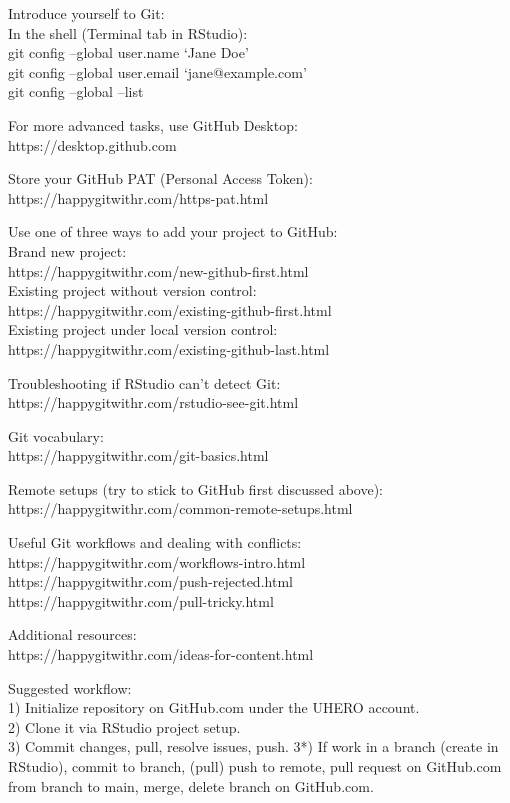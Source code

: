 \documentclass[
  letterpaper,
  DIV=11,
  numbers=noendperiod]{scrreport}
\begin{document}
Introduce yourself to Git:\\
In the shell (Terminal tab in RStudio):\\
git config --global user.name `Jane Doe'\\
git config --global user.email `jane@example.com'\\
git config --global --list

For more advanced tasks, use GitHub Desktop:\\
https://desktop.github.com

Store your GitHub PAT (Personal Access Token):\\
https://happygitwithr.com/https-pat.html

Use one of three ways to add your project to GitHub:\\
Brand new project:\\
https://happygitwithr.com/new-github-first.html\\
Existing project without version control:\\
https://happygitwithr.com/existing-github-first.html\\
Existing project under local version control:\\
https://happygitwithr.com/existing-github-last.html

Troubleshooting if RStudio can't detect Git:\\
https://happygitwithr.com/rstudio-see-git.html

Git vocabulary:\\
https://happygitwithr.com/git-basics.html

Remote setups (try to stick to GitHub first discussed above):\\
https://happygitwithr.com/common-remote-setups.html

Useful Git workflows and dealing with conflicts:\\
https://happygitwithr.com/workflows-intro.html\\
https://happygitwithr.com/push-rejected.html\\
https://happygitwithr.com/pull-tricky.html

Additional resources:\\
https://happygitwithr.com/ideas-for-content.html

Suggested workflow:\\
1) Initialize repository on GitHub.com under the UHERO account.\\
2) Clone it via RStudio project setup.\\
3) Commit changes, pull, resolve issues, push. 3*) If work in a branch
(create in RStudio), commit to branch, (pull) push to remote, pull
request on GitHub.com from branch to main, merge, delete branch on
GitHub.com.
\end{document}
